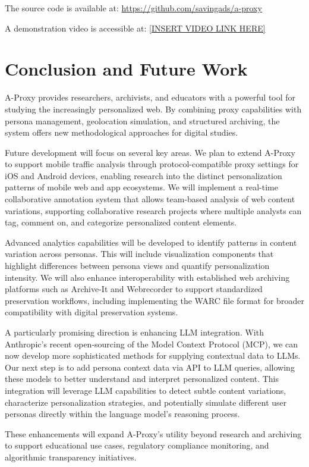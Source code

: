 \documentclass[sigconf]{acmart}
\begin{document}
The source code is available at: \url{https://github.com/savingads/a-proxy}

A demonstration video is accessible at: \url{[INSERT VIDEO LINK HERE]}

\section{Conclusion and Future Work}
A-Proxy provides researchers, archivists, and educators with a powerful tool for studying the increasingly personalized web. By combining proxy capabilities with persona management, geolocation simulation, and structured archiving, the system offers new methodological approaches for digital studies.

Future development will focus on several key areas. We plan to extend A-Proxy to support mobile traffic analysis through protocol-compatible proxy settings for iOS and Android devices, enabling research into the distinct personalization patterns of mobile web and app ecosystems. We will implement a real-time collaborative annotation system that allows team-based analysis of web content variations, supporting collaborative research projects where multiple analysts can tag, comment on, and categorize personalized content elements.

Advanced analytics capabilities will be developed to identify patterns in content variation across personas. This will include visualization components that highlight differences between persona views and quantify personalization intensity. We will also enhance interoperability with established web archiving platforms such as Archive-It and Webrecorder to support standardized preservation workflows, including implementing the WARC file format for broader compatibility with digital preservation systems.

A particularly promising direction is enhancing LLM integration. With Anthropic's recent open-sourcing of the Model Context Protocol (MCP), we can now develop more sophisticated methods for supplying contextual data to LLMs. Our next step is to add persona context data via API to LLM queries, allowing these models to better understand and interpret personalized content. This integration will leverage LLM capabilities to detect subtle content variations, characterize personalization strategies, and potentially simulate different user personas directly within the language model's reasoning process.

These enhancements will expand A-Proxy's utility beyond research and archiving to support educational use cases, regulatory compliance monitoring, and algorithmic transparency initiatives.



\end{document}
